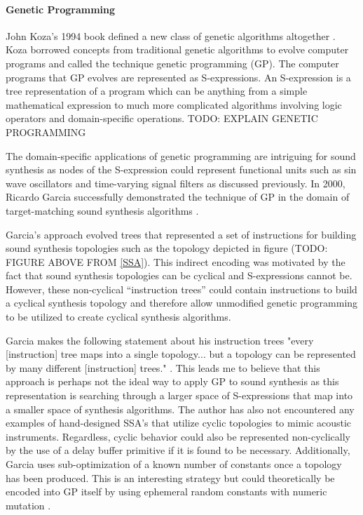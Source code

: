 \documentclass[12pt]{article}
\begin{document}
\paragraph{Genetic Programming}
John Koza's 1994 book defined a new class of genetic algorithms altogether \citep{koza1992genetic}. Koza borrowed concepts from traditional genetic algorithms to evolve computer programs and called the technique genetic programming (GP). The computer programs that GP evolves are represented as S-expressions. An S-expression is a tree representation of a program which can be anything from a simple mathematical expression to much more complicated algorithms involving logic operators and domain-specific operations. TODO: EXPLAIN GENETIC PROGRAMMING
			
The domain-specific applications of genetic programming are intriguing for sound synthesis as nodes of the S-expression could represent functional units such as sin wave oscillators and time-varying signal filters as discussed previously. In 2000, Ricardo Garcia successfully demonstrated the technique of GP in the domain of target-matching sound synthesis algorithms \citep{garcia2000towards}.

Garcia's approach evolved trees that represented a set of instructions for building sound synthesis topologies such as the topology depicted in figure (TODO: FIGURE ABOVE FROM \ref{SSA}). This indirect encoding was motivated by the fact that sound synthesis topologies can be cyclical and S-expressions cannot be. However, these non-cyclical ``instruction trees'' could contain instructions to build a cyclical synthesis topology and therefore allow unmodified genetic programming to be utilized to create cyclical synthesis algorithms.

Garcia makes the following statement about his instruction trees "every [instruction] tree maps into a single topology... but a topology can be represented by many different [instruction] trees." \citep{garcia2012automatic}. This leads me to believe that this approach is perhaps not the ideal way to apply GP to sound synthesis as this representation is searching through a larger space of S-expressions that map into a smaller space of synthesis algorithms. The author has also not encountered any examples of hand-designed SSA's that utilize cyclic topologies to mimic acoustic instruments. Regardless, cyclic behavior could also be represented non-cyclically by the use of a delay buffer primitive if it is found to be necessary. Additionally, Garcia uses sub-optimization of a known number of constants once a topology has been produced. This is an interesting strategy but  could theoretically be encoded into GP itself by using ephemeral random constants with numeric mutation \citep{evett1998numeric}.
\end{document}
